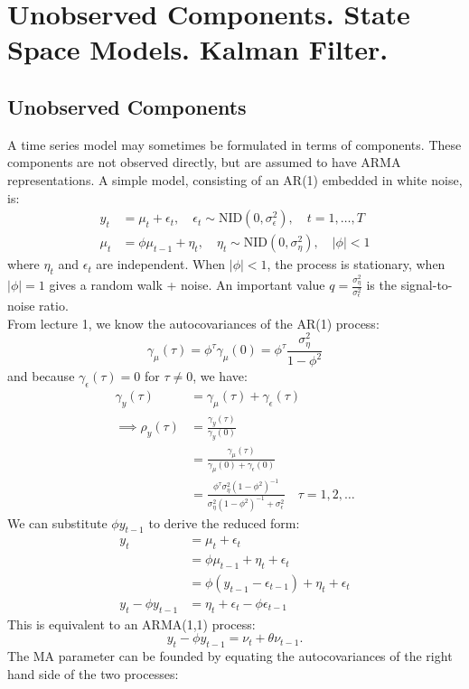 \documentclass[DIV=14,titlepage=false]{scrreprt}
\begin{document}
\setcounter{chapter}{1}
\vspace{-10pt}


\chapter{Unobserved Components. State Space Models. Kalman Filter.}

\section{Unobserved Components}
A time series model may sometimes be formulated in terms of components. These components are not observed directly, but are assumed to have ARMA representations. A simple model, consisting of an AR(1) embedded in white noise, is:
\begin{align*}
y_t &= \mu_t + \epsilon_t, \quad \epsilon_t \sim \text{NID}(0,\sigma^2_\epsilon), \quad t=1,\dots,T\\
\mu_t &= \phi \mu_{t-1} + \eta_t, \quad \eta_t \sim \text{NID}(0,\sigma^2_\eta), \quad |\phi|<1
\end{align*}
where $\eta_t$ and $\epsilon_t$ are independent. When $|\phi|<1$, the process is stationary, when $|\phi|=1$ gives a random walk + noise. An important value $q = \frac{\sigma^2_\eta}{\sigma^2_\epsilon}$ is the signal-to-noise ratio. \\
From lecture 1, we know the autocovariances of the AR(1) process:
\[
    \gamma_\mu (\tau) = \phi^\tau \gamma_\mu(0) = \phi^\tau \frac{\sigma^2_\eta}{1-\phi^2}
\]
and because $\gamma_\epsilon(\tau) = 0$ for $\tau \neq 0$, we have:
\begin{align*}
    \gamma_y(\tau) &= \gamma_\mu(\tau) + \gamma_\epsilon(\tau) \\
    \implies \rho_y(\tau) &= \frac{\gamma_y(\tau)}{\gamma_y(0)}\\
    &= \frac{\gamma_\mu(\tau)}{\gamma_\mu(0)+\gamma_\epsilon(0)}\\
    &= \frac{\phi^\tau \sigma^2_\eta (1-\phi^2)^{-1}}{\sigma^2_\eta (1-\phi^2)^{-1} + \sigma^2_\epsilon} \quad \tau = 1, 2, \dots
\end{align*}
    We can substitute $\phi y_{t-1}$ to derive the reduced form:
\begin{align*}
    y_t &= \mu_t + \epsilon_t\\
    &= \phi \mu_{t-1} + \eta_t + \epsilon_t\\
    &= \phi (y_{t-1} - \epsilon_{t-1}) + \eta_t + \epsilon_t\\
    y_t - \phi y_{t-1} &= \eta_t + \epsilon_t - \phi \epsilon_{t-1}
\end{align*}
This is equivalent to an ARMA(1,1) process: 
\[
    y_t - \phi y_{t-1} = \nu_t + \theta \nu_{t-1}.
\]
The MA parameter can be founded by equating the autocovariances of the right hand side of the two processes:\\
\end{document}
